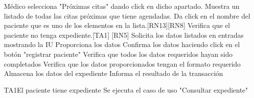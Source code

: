 \begin{UCtrayectoria}{Médico}
		\UCpaso[\UCactor] selecciona "Próximas citas" dando click en dicho apartado.
		\UCpaso Muestra un listado de todas las citas próximas que tiene agendadas. 
		\UCpaso[\UCactor] Da click en el nombre del paciente que es uno de los elementos en la lista.[RN13][RN8]
		\UCpaso Verifica que el paciente no tenga expediente.[TA1] [RN5]
		\UCpaso Solicita los datos listados en entradas mostrando la IU
		\UCpaso [\UCactor] Proporciona los datos
		\UCpaso [\UCactor] Confirma los datos haciendo click en el botón "registrar paciente"
		\UCpaso Verifica que todos los datos requeridos hayan sido completados
		\UCpaso Verifica que los datos proporcionados tengan el formato requerido
		\UCpaso Almacena los datos del expediente 
		\UCpaso Informa el resultado de la transacción
\end{UCtrayectoria}

\begin{UCtrayectoriaA}{TA1}{El paciente tiene expediente}
	\UCpaso Se ejecuta el caso de uso  "Consultar expediente"
	
\end{UCtrayectoriaA}

